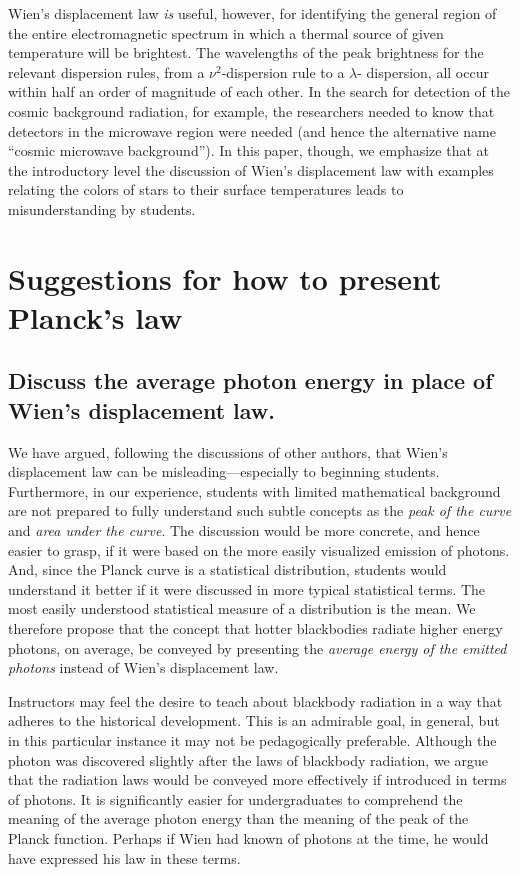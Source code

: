 \documentclass[12pt,aps,prb,preprint]{revtex4}   %
\begin{document}
Wien's displacement law {\it is} useful, however, for identifying the general region of the entire electromagnetic spectrum in which a thermal source of given temperature will be brightest.  The wavelengths of the peak brightness for the relevant dispersion rules, from a $\nu^2$-dispersion rule to a $\lambda$- dispersion, all occur within half an order of magnitude of each other.\cite{Heald,Stewart}  In the search for detection of the cosmic background radiation, for example, the researchers needed to know that detectors in the microwave region were needed (and hence the alternative name ``cosmic microwave background'').  In this paper, though, we emphasize that at the introductory level the discussion of Wien's displacement law with examples relating the colors of stars to their surface temperatures leads to misunderstanding by students.

\section{Suggestions for how to present Planck's law}

\subsection{Discuss the average photon energy in place of Wien's displacement law.}

We have argued, following the discussions of other authors, that Wien's displacement law can be misleading---especially to beginning students.  Furthermore, in our experience, students with limited mathematical background are not prepared to fully understand such subtle concepts as the {\it peak of the curve} and {\it area under the curve}.  The discussion would be more concrete, and hence easier to grasp, if it were based on the more easily visualized emission of photons.  And, since the Planck curve is a statistical distribution, students would understand it better if it were discussed in more typical statistical terms.  The most easily understood statistical measure of a distribution is the mean.  We therefore propose that the concept that hotter blackbodies radiate higher energy photons, on average, be conveyed by presenting the \emph{average energy of the emitted photons} instead of Wien's displacement law.

Instructors may feel the desire to teach about blackbody radiation in a way that adheres to the historical development.  This is an admirable goal, in general, but in this particular instance it may not be pedagogically preferable.  Although the photon was discovered slightly after the laws of blackbody radiation, we argue that the radiation laws would be conveyed more effectively if introduced in terms of photons.  It is significantly easier for undergraduates to comprehend the meaning of the average photon energy than the meaning of the peak of the Planck function.  Perhaps if Wien had known of photons at the time, he would have expressed his law in these terms.  
\end{document}
